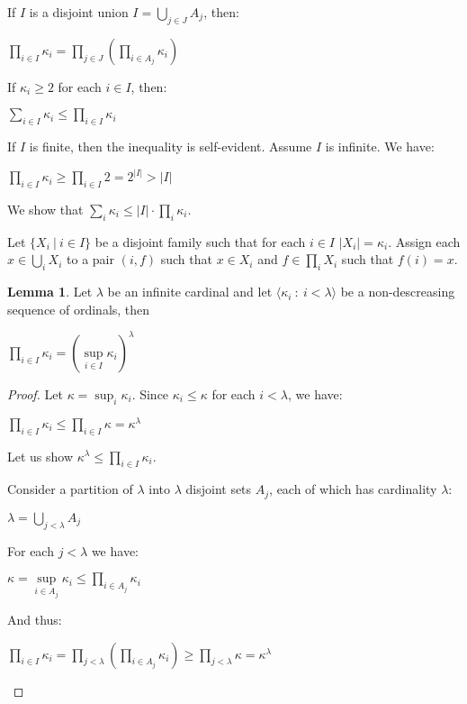 \documentclass[8pt]{article}
\theoremstyle{definition}
\theoremstyle{definition}
\theoremstyle{definition}
\theoremstyle{definition}
\theoremstyle{definition}
\theoremstyle{definition}
\theoremstyle{definition}
\theoremstyle{definition}
\newtheorem{lemma}{Lemma}[section]
\theoremstyle{definition}
\theoremstyle{definition}
\theoremstyle{definition}
\theoremstyle{definition}
\theoremstyle{definition}
\theoremstyle{definition}
\theoremstyle{question}
\begin{document}
If $I$ is a disjoint union $I = \bigcup \limits_{j \in J} A_j$, then:
\begin{center}
  $\prod \limits_{i \in I} \kappa_i = \prod \limits_{j \in J} (\prod \limits_{i \in A_j} \kappa_i)$
\end{center}

If $\kappa_i \geq 2$ for each $i \in I$, then:
\begin{center}
  $\sum \limits_{i \in I} \kappa_i \leq \prod \limits_{i \in I} \kappa_i$
\end{center}
If $I$ is finite, then the inequality is self-evident. Assume $I$ is infinite. We have:
\begin{center}
  $\prod \limits_{i \in I} \kappa_i \geq \prod \limits_{i \in I} 2 = 2^{|I|} > |I|$
\end{center}
We show that $\sum_i \kappa_i \leq |I| \cdot \prod_i \kappa_i$.

Let $\{ X_i \: | \: i \in I \}$ be a disjoint family such that for each $i \in I$ $|X_i| = \kappa_i$.
Assign each $x \in \bigcup_i X_i$ to a pair $(i, f)$ such that $x \in X_i$ and $f \in \prod_i X_i$
such that $f(i) = x$.

\begin{lemma}
  Let $\lambda$ be an infinite cardinal and let $\langle \kappa_i \: : \: i < \lambda \rangle$ 
  be a non-descreasing sequence of ordinals, then
  \begin{center}
    $\prod \limits_{i \in I} \kappa_i = (\sup \limits_{i \in I} \kappa_i)^{\lambda}$
  \end{center}
\end{lemma}
\begin{proof}
  Let $\kappa = \sup_i \kappa_i$. Since $\kappa_i \leq \kappa$ for each $i < \lambda$, we have:
  \begin{center}
    $\prod \limits_{i \in I} \kappa_i \leq \prod \limits_{i \in I} \kappa = \kappa^{\lambda}$
  \end{center}
  Let us show $\kappa^{\lambda} \leq \prod \limits_{i \in I} \kappa_i$.

  Consider a partition of $\lambda$ into $\lambda$ disjoint sets $A_j$, each of which has cardinality $\lambda$:
  \begin{center}
    $\lambda = \bigcup \limits_{j < \lambda} A_j$
  \end{center}

  For each $j < \lambda$ we have:
  \begin{center}
    $\kappa = \sup \limits_{i \in A_j} \kappa_i \leq \prod \limits_{i \in A_j} \kappa_i$
  \end{center}
  And thus:
  \begin{center}
    $\prod \limits_{i \in I} \kappa_i = \prod \limits_{j < \lambda} (\prod \limits_{i \in A_j} \kappa_i) \geq \prod \limits_{j < \lambda} \kappa = \kappa^{\lambda}$
  \end{center}
\end{proof}
\end{document}
